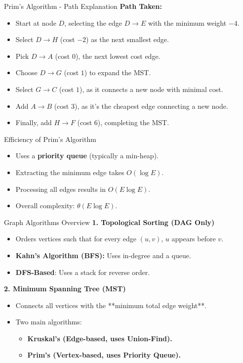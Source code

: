 \begin{frame}{Prim's Algorithm - Path Explanation}
    \textbf{Path Taken:}
    \begin{itemize}
        \item Start at node \( D \), selecting the edge \( D \to E \) with the minimum weight \(-4\).
        \item Select \( D \to H \) (cost \( -2 \)) as the next smallest edge.
        \item Pick \( D \to A \) (cost \( 0 \)), the next lowest cost edge.
        \item Choose \( D \to G \) (cost \( 1 \)) to expand the MST.
        \item Select \( G \to C \) (cost \( 1 \)), as it connects a new node with minimal cost.
        \item Add \( A \to B \) (cost \( 3 \)), as it’s the cheapest edge connecting a new node.
        \item Finally, add \( H \to F \) (cost \( 6 \)), completing the MST.
    \end{itemize}
\end{frame}



\begin{frame}{Efficiency of Prim’s Algorithm}
    \begin{itemize}
        \item Uses a \textbf{priority queue} (typically a min-heap).
        \item Extracting the minimum edge takes \( O(\log E) \).
        \item Processing all edges results in \( O(E \log E) \).
        \item Overall complexity: \( \theta(E \log E) \).
    \end{itemize}
\end{frame}

\begin{frame}{Graph Algorithms Overview}
    \textbf{1. Topological Sorting (DAG Only)}
    \begin{itemize}
        \item Orders vertices such that for every edge $(u, v)$, $u$ appears before $v$.
        \item \textbf{Kahn’s Algorithm (BFS):} Uses in-degree and a queue.
        \item \textbf{DFS-Based}: Uses a stack for reverse order.
    \end{itemize}

    \textbf{2. Minimum Spanning Tree (MST)}
    \begin{itemize}
        \item Connects all vertices with the **minimum total edge weight**.
        \item Two main algorithms:
        \begin{itemize}
            \item \textbf{Kruskal’s (Edge-based, uses Union-Find).}
            \item \textbf{Prim’s (Vertex-based, uses Priority Queue).}
        \end{itemize}
    \end{itemize}
\end{frame}

